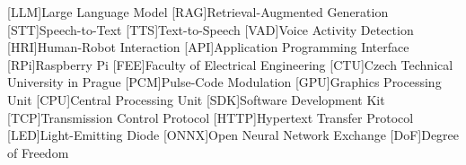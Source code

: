 [LLM]{Large Language Model}
[RAG]{Retrieval-Augmented Generation}
[STT]{Speech-to-Text}
[TTS]{Text-to-Speech}
[VAD]{Voice Activity Detection}
[HRI]{Human-Robot Interaction}
[API]{Application Programming Interface}
[RPi]{Raspberry Pi}
[FEE]{Faculty of Electrical Engineering}
[CTU]{Czech Technical University in Prague}
[PCM]{Pulse-Code Modulation}
[GPU]{Graphics Processing Unit}
[CPU]{Central Processing Unit}
[SDK]{Software Development Kit}
[TCP]{Transmission Control Protocol}
[HTTP]{Hypertext Transfer Protocol}
[LED]{Light-Emitting Diode}
[ONNX]{Open Neural Network Exchange}
[DoF]{Degree of Freedom}
